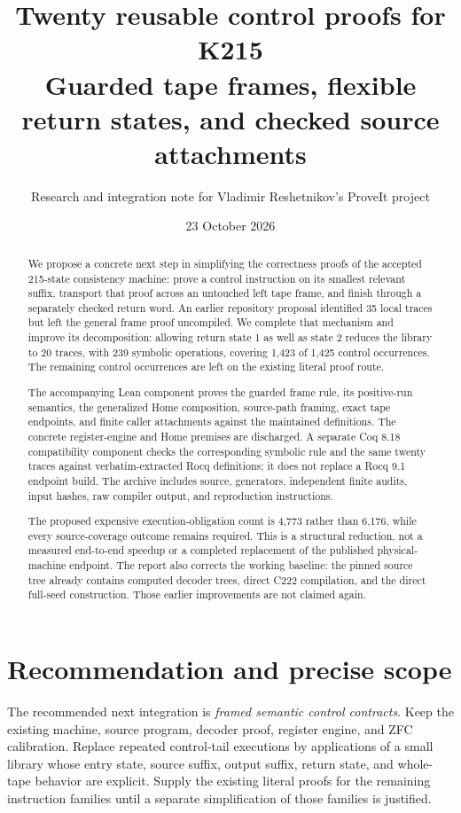 \documentclass[11pt]{article}
\title{Twenty reusable control proofs for K215\\\large Guarded tape frames, flexible return states, and checked source attachments}
\author{Research and integration note for Vladimir Reshetnikov's ProveIt project}
\date{23 October 2026}
\theoremstyle{definition}\newtheorem{definition}[theorem]{Definition}
\theoremstyle{remark}\newtheorem{remark}[theorem]{Remark}
\begin{document}
\maketitle
\begin{abstract}
We propose a concrete next step in simplifying the correctness proofs of the accepted 215-state consistency machine: prove a control instruction on its smallest relevant suffix, transport that proof across an untouched left tape frame, and finish through a separately checked return word. An earlier repository proposal identified 35 local traces but left the general frame proof uncompiled. We complete that mechanism and improve its decomposition: allowing return state 1 as well as state 2 reduces the library to 20 traces, with 239 symbolic operations, covering 1,423 of 1,425 control occurrences. The remaining control occurrences are left on the existing literal proof route.

The accompanying Lean component proves the guarded frame rule, its positive-run semantics, the generalized Home composition, source-path framing, exact tape endpoints, and finite caller attachments against the maintained definitions. The concrete register-engine and Home premises are discharged. A separate Coq 8.18 compatibility component checks the corresponding symbolic rule and the same twenty traces against verbatim-extracted Rocq definitions; it does not replace a Rocq 9.1 endpoint build. The archive includes source, generators, independent finite audits, input hashes, raw compiler output, and reproduction instructions.

The proposed expensive execution-obligation count is 4,773 rather than 6,176, while every source-coverage outcome remains required. This is a structural reduction, not a measured end-to-end speedup or a completed replacement of the published physical-machine endpoint. The report also corrects the working baseline: the pinned source tree already contains computed decoder trees, direct C222 compilation, and the direct full-seed construction. Those earlier improvements are not claimed again.
\end{abstract}
\clearpage
\tableofcontents
\clearpage

\section{Recommendation and precise scope}

The recommended next integration is \emph{framed semantic control contracts}. Keep the existing machine, source program, decoder proof, register engine, and ZFC calibration. Replace repeated control-tail executions by applications of a small library whose entry state, source suffix, output suffix, return state, and whole-tape behavior are explicit. Supply the existing literal proofs for the remaining instruction families until a separate simplification of those families is justified.
\end{document}
